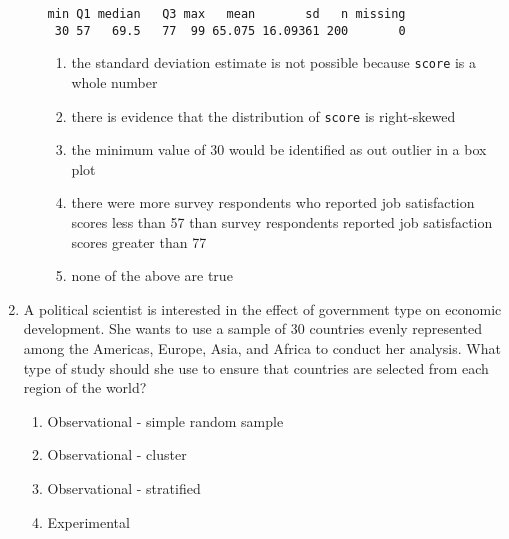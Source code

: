 \documentclass[11pt,fullpage]{amsart}
\begin{document}
\begin{enumerate}
\begin{enumerate}
\begin{verbatim}
min Q1 median   Q3 max   mean       sd   n missing
 30 57   69.5   77  99 65.075 16.09361 200       0
\end{verbatim}
\begin{enumerate}
    \item
    the standard deviation estimate is not possible because \texttt{score} is a whole number
    \item
    there is evidence that the distribution of \texttt{score} is right-skewed
    \item
    the minimum value of 30 would be identified as out outlier in a box plot
    \item
    there were more survey respondents who reported job satisfaction scores less than 57 than survey respondents reported job satisfaction scores greater than 77
    \item
    none of the above are true
\end{enumerate}
\end{enumerate}

\vfill


\item
A political scientist is interested in the effect of government type on economic development. She wants to use a sample of 30 countries evenly represented among the Americas, Europe, Asia, and Africa to conduct her analysis. What type of study should she use to ensure that countries are selected from each region of the world?
\begin{enumerate}
\item Observational - simple random sample
\item Observational - cluster
\item Observational - stratified
\item Experimental
\end{enumerate}

\vfill


\end{enumerate}
\end{document}

